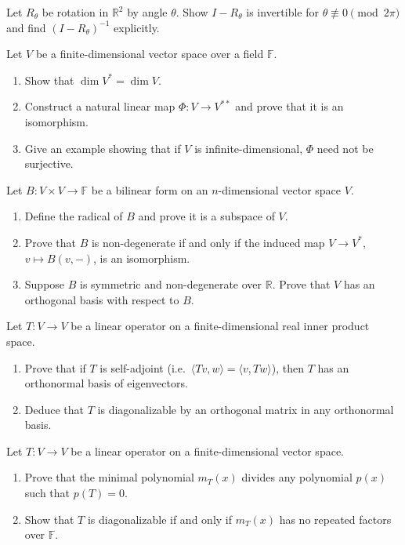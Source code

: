 \documentclass[11pt]{article}
\begin{document}
\begin{problem}
Let $R_\theta$ be rotation in $\mathbb{R}^2$ by angle $\theta$. Show $I-R_\theta$ is invertible for $\theta\not\equiv 0\pmod{2\pi}$ and find $(I-R_\theta)^{-1}$ explicitly.
\end{problem}
\begin{problem}
Let $V$ be a finite-dimensional vector space over a field $\mathbb{F}$.
\begin{enumerate}
    \item Show that $\dim V^* = \dim V$.
    \item Construct a natural linear map $\Phi: V \to V^{**}$ and prove that it is an isomorphism.
    \item Give an example showing that if $V$ is infinite-dimensional, $\Phi$ need not be surjective.
\end{enumerate}
\end{problem}

\begin{problem}
Let $B: V \times V \to \mathbb{F}$ be a bilinear form on an $n$-dimensional vector space $V$.
\begin{enumerate}
    \item Define the radical of $B$ and prove it is a subspace of $V$.
    \item Prove that $B$ is non-degenerate if and only if the induced map $V \to V^*$, $v \mapsto B(v, -)$, is an isomorphism.
    \item Suppose $B$ is symmetric and non-degenerate over $\mathbb{R}$. Prove that $V$ has an orthogonal basis with respect to $B$.
\end{enumerate}
\end{problem}

\begin{problem}
Let $T: V \to V$ be a linear operator on a finite-dimensional real inner product space.
\begin{enumerate}
    \item Prove that if $T$ is self-adjoint (i.e.\ $\langle T v, w \rangle = \langle v, T w \rangle$), then $T$ has an orthonormal basis of eigenvectors.
    \item Deduce that $T$ is diagonalizable by an orthogonal matrix in any orthonormal basis.
\end{enumerate}
\end{problem}

\begin{problem}
Let $T: V \to V$ be a linear operator on a finite-dimensional vector space.
\begin{enumerate}
    \item Prove that the minimal polynomial $m_T(x)$ divides any polynomial $p(x)$ such that $p(T) = 0$.
    \item Show that $T$ is diagonalizable if and only if $m_T(x)$ has no repeated factors over $\mathbb{F}$.
\end{enumerate}
\end{problem}
\end{document}
